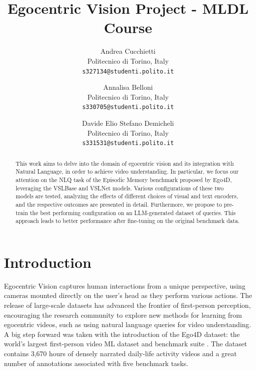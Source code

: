 \documentclass[10pt,twocolumn,letterpaper]{article}
\begin{document}
\title{Egocentric Vision Project - MLDL Course}

\author{Andrea Cucchietti\\
Politecnico di Torino, Italy\\
{\tt\small s327134@studenti.polito.it}
\and
Annalisa Belloni\\
Politecnico di Torino, Italy\\
{\tt\small s330705@studenti.polito.it}
\and
Davide Elio Stefano Demicheli\\
Politecnico di Torino, Italy\\
{\tt\small s331531@studenti.polito.it}
}
\maketitle

\begin{abstract}
    This work aims to delve into the domain of egocentric vision and its integration with Natural Language, in order to achieve video understanding. In particular, we focus our attention on the NLQ task of the Episodic Memory benchmark proposed by Ego4D, leveraging the VSLBase and VSLNet models.  
    Various configurations of these two models are tested, analyzing the effects of different choices of visual and text encoders, and
    the respective outcomes are presented in detail.  
    Furthermore, we propose to pre-train the best performing configuration on an LLM-generated dataset of queries. This approach leads to better performance after fine-tuning on the original benchmark data.
\end{abstract}

\section{Introduction}
\label{sec:intro}

Egocentric Vision captures human interactions from a unique perspective, using cameras mounted directly on the user's head as they perform various actions. The release of large-scale datasets has advanced the frontier of first-person perception, encouraging the research community to explore new methods for learning from egocentric videos, such as using natural language queries for video understanding.\\
A big step forward was taken with the introduction of the Ego4D dataset: the world's largest first-person video ML dataset and benchmark suite \cite{grauman2022ego4d}.
The dataset contains 3,670 hours of densely narrated daily-life activity videos and a great number of annotations associated with five benchmark tasks.
\end{document}
